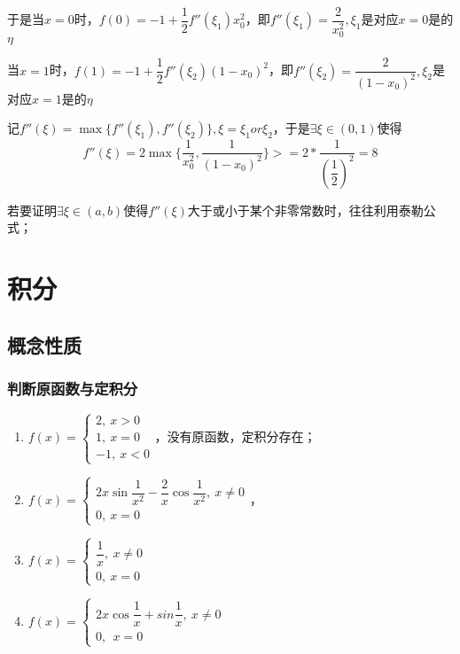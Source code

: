 于是当\(x = 0\)时，\(f(0) = -1 + \dfrac{1}{2}f''(\xi_1)x_0^2\)，即\(f''(\xi_1) = \dfrac{2}{x_0^2}, \xi_1\)是对应\(x = 0\)是的\(\eta\)

当\(x = 1\)时，\(f(1) = -1 + \dfrac{1}{2}f''(\xi_2)(1 - x_0)^2\)，即\(f''(\xi_2) = \dfrac{2}{(1 - x_0)^2}, \xi_2\)是对应\(x = 1\)是的\(\eta\)

记\(f''(\xi) = \max\{f''(\xi_1), f''(\xi_2)\}, \xi = \xi_1 or \xi_2\)，于是\(\exists \xi \in (0, 1)\)使得\[f''(\xi) = 2\max\{\dfrac{1}{x_0^2}, \dfrac{1}{(1 - x_0)^2}\} >= 2 * \dfrac{1}{(\dfrac{1}{2})^2} = 8\]

若要证明\(\exists \xi \in (a, b)\)使得\(f''(\xi)\)大于或小于某个非零常数时，往往利用泰勒公式；


\section{积分}

\subsection{概念性质}

\subsubsection{判断原函数与定积分}
\begin{enumerate}
    \item \(f(x) = \begin{cases}
    2,\ x > 0 \\ 
    1,\ x = 0 \\ 
    -1,\ x < 0
    \end{cases}\)，没有原函数，定积分存在；
    \item \(f(x) = \begin{cases}
        2x\sin\dfrac{1}{x^2} - \dfrac{2}{x}\cos\dfrac{1}{x^2},\ x \neq 0 \\ 
        0,\ x = 0
    \end{cases}\)，
    \item \(f(x) = \begin{cases}
        \dfrac{1}{x},\ x \neq 0 \\ 
        0,\ x = 0
    \end{cases}\)
    \item \(f(x) = \begin{cases}
        2x\cos\dfrac{1}{x} + sin\dfrac{1}{x},\ x \neq 0 \\ 
        0,\ \ x = 0
    \end{cases}\)
\end{enumerate}

